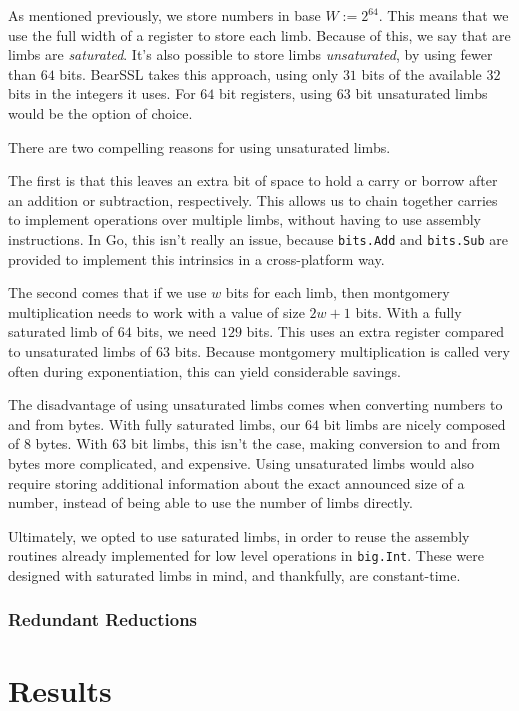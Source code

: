 \documentclass[11pt, a4paper]{article} %
\begin{document}
{As mentioned previously, we store numbers in base
$W := 2^{64}$. This means that we use the full width of a register
to store each limb. Because of this, we say that are limbs
are \emph{saturated}. It's also possible to store
limbs \emph{unsaturated}, by using fewer than $64$ bits.
BearSSL 
\cite{pornin_bearssl_2020-1}
takes this approach, using only $31$ bits of the available $32$ bits
in the integers it uses. For $64$ bit registers, using $63$ bit unsaturated
limbs would be the option of choice.

There are two compelling reasons for using unsaturated limbs.

The first is that this leaves an extra bit of space to hold a carry
or borrow after an addition or subtraction, respectively. This allows
us to chain together carries to implement operations over multiple
limbs, without having to use assembly instructions. In Go,
this isn't really an issue, because \texttt{bits.Add} and
\texttt{bits.Sub} are provided to implement this intrinsics
in a cross-platform way.

The second comes that if we use $w$ bits for each limb, then montgomery
multiplication needs to work with a value of size $2w + 1$ bits. With a fully
saturated limb of $64$ bits, we need $129$ bits. This uses
an extra register compared to unsaturated limbs of $63$ bits. Because
montgomery multiplication is called very often during exponentiation,
this can yield considerable savings.

The disadvantage of using unsaturated limbs comes when converting
numbers to and from bytes. With fully saturated limbs, our
$64$ bit limbs are nicely composed of $8$ bytes. With $63$ bit limbs,
this isn't the case, making conversion to and from bytes more
complicated, and expensive. Using unsaturated limbs would
also require storing additional information about the exact
announced size of a number, instead of being able to use
the number of limbs directly.

Ultimately, we opted to use saturated limbs, in order to reuse
the assembly routines already implemented for low level
operations in \texttt{big.Int}. These were designed with
saturated limbs in mind, and thankfully, are constant-time.

\subsubsection{Redundant Reductions}

\section{Results}

}
\end{document}
